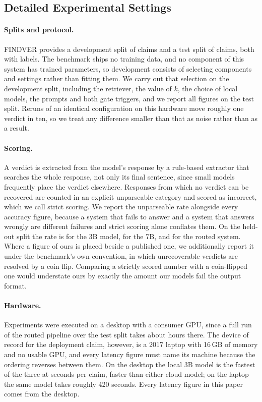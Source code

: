 \documentclass{article}
\begin{document}
\subsection{Detailed Experimental Settings}
\label{appendix:setup}
\paragraph{Splits and protocol.}
FINDVER provides a development split of \nDev{} claims and a test split of \nTest{} claims,
both with labels. The benchmark ships no training data, and no component of this system has
trained parameters, so development consists of selecting components and settings rather than
fitting them. We carry out that selection on the development split, including the retriever,
the value of $k$, the choice of local models, the prompts and both gate triggers, and we
report all figures on the test split. Reruns of an identical configuration on this hardware
move roughly one verdict in ten, so we treat any difference smaller than that as noise rather
than as a result.

\paragraph{Scoring.}
A verdict is extracted from the model's response by a rule-based extractor that searches the
whole response, not only its final sentence, since small models frequently place the verdict
elsewhere. Responses from which no verdict can be recovered are counted in an explicit
unparseable category and scored as incorrect, which we call strict scoring. We report the
unparseable rate alongside every accuracy figure, because a system that fails to answer and
a system that answers wrongly are different failures and strict scoring alone conflates
them. On the held-out split the rate is \unparseThreeB{} for the 3B model, \unparseSevenB{}
for the 7B, and \unparseRouted{} for the routed system. Where a figure of ours is placed
beside a published one, we additionally report it under the benchmark's own convention, in
which unrecoverable verdicts are resolved by a coin flip. Comparing a strictly scored number
with a coin-flipped one would understate ours by exactly the amount our models fail the
output format.

\paragraph{Hardware.}
Experiments were executed on a desktop with a consumer GPU, since a full run of the routed
pipeline over the test split takes about \latRunHours{} hours there. The device of record
for the deployment claim, however, is a 2017 laptop with 16\,GB of memory and no usable
GPU, and every latency figure must name its machine because the ordering reverses between
them. On the desktop the local 3B model is the fastest of the three at
\latThreeBMed{} seconds per claim, faster than either cloud model; on the laptop the same
model takes roughly 420 seconds. Every latency figure in this paper comes from the desktop.
\end{document}
